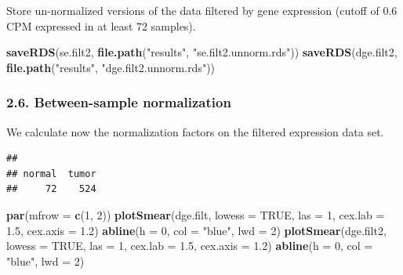 \documentclass[]{article}
\newenvironment{Shaded}{\begin{snugshade}}{\end{snugshade}}
\newcommand{\KeywordTok}[1]{\textcolor[rgb]{0.13,0.29,0.53}{\textbf{{#1}}}}
\newcommand{\DataTypeTok}[1]{\textcolor[rgb]{0.13,0.29,0.53}{{#1}}}
\newcommand{\DecValTok}[1]{\textcolor[rgb]{0.00,0.00,0.81}{{#1}}}
\newcommand{\FloatTok}[1]{\textcolor[rgb]{0.00,0.00,0.81}{{#1}}}
\newcommand{\StringTok}[1]{\textcolor[rgb]{0.31,0.60,0.02}{{#1}}}
\newcommand{\OtherTok}[1]{\textcolor[rgb]{0.56,0.35,0.01}{{#1}}}
\newcommand{\NormalTok}[1]{{#1}}
\begin{document}
Store un-normalized versions of the data filtered by gene expression
(cutoff of 0.6 CPM expressed in at least 72 samples).

\begin{Shaded}
\begin{Highlighting}[]
\KeywordTok{saveRDS}\NormalTok{(se.filt2, }\KeywordTok{file.path}\NormalTok{(}\StringTok{"results"}\NormalTok{, }\StringTok{"se.filt2.unnorm.rds"}\NormalTok{))}
\KeywordTok{saveRDS}\NormalTok{(dge.filt2, }\KeywordTok{file.path}\NormalTok{(}\StringTok{"results"}\NormalTok{, }\StringTok{"dge.filt2.unnorm.rds"}\NormalTok{))}
\end{Highlighting}
\end{Shaded}

\subsubsection{2.6. Between-sample
normalization}\label{between-sample-normalization}

We calculate now the normalization factors on the filtered expression
data set.

\begin{Shaded}
\end{Shaded}

\begin{verbatim}
## 
## normal  tumor 
##     72    524
\end{verbatim}

\begin{Shaded}
\begin{Highlighting}[]
\KeywordTok{par}\NormalTok{(}\DataTypeTok{mfrow =} \KeywordTok{c}\NormalTok{(}\DecValTok{1}\NormalTok{, }\DecValTok{2}\NormalTok{))}
\KeywordTok{plotSmear}\NormalTok{(dge.filt, }\DataTypeTok{lowess =} \OtherTok{TRUE}\NormalTok{, }\DataTypeTok{las =} \DecValTok{1}\NormalTok{, }\DataTypeTok{cex.lab =} \FloatTok{1.5}\NormalTok{, }\DataTypeTok{cex.axis =} \FloatTok{1.2}\NormalTok{)}
\KeywordTok{abline}\NormalTok{(}\DataTypeTok{h =} \DecValTok{0}\NormalTok{, }\DataTypeTok{col =} \StringTok{"blue"}\NormalTok{, }\DataTypeTok{lwd =} \DecValTok{2}\NormalTok{)}
\KeywordTok{plotSmear}\NormalTok{(dge.filt2, }\DataTypeTok{lowess =} \OtherTok{TRUE}\NormalTok{, }\DataTypeTok{las =} \DecValTok{1}\NormalTok{, }\DataTypeTok{cex.lab =} \FloatTok{1.5}\NormalTok{, }\DataTypeTok{cex.axis =} \FloatTok{1.2}\NormalTok{)}
\KeywordTok{abline}\NormalTok{(}\DataTypeTok{h =} \DecValTok{0}\NormalTok{, }\DataTypeTok{col =} \StringTok{"blue"}\NormalTok{, }\DataTypeTok{lwd =} \DecValTok{2}\NormalTok{)}
\end{Highlighting}
\end{Shaded}
\end{document}
